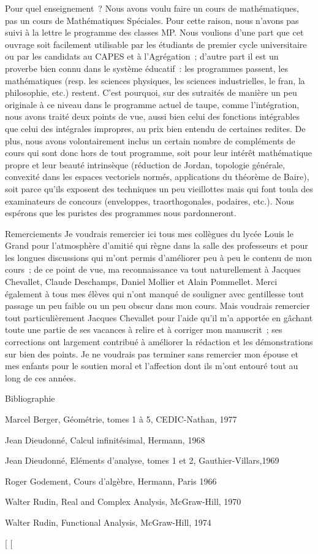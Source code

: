 \documentclass[]{article}
\begin{document}
Pour quel enseignement~? Nous avons voulu faire un cours de
mathématiques, pas un cours de Mathématiques Spéciales. Pour cette
raison, nous n'avons pas suivi à la lettre le programme des classes MP.
Nous voulions d'une part que cet ouvrage soit facilement utilisable par
les étudiants de premier cycle universitaire ou par les candidats au
CAPES et à l'Agrégation~; d'autre part il est un proverbe bien connu
dans le système éducatif~: les programmes passent, les mathématiques
(resp. les sciences physiques, les sciences industrielles, le
fran\ccais, la philosophie, etc.) restent. C'est
pourquoi, sur des su\jmathets traités de manière un peu originale à ce niveau
dans le programme actuel de taupe, comme l'intégration, nous avons
traité deux points de vue, aussi bien celui des fonctions intégrables
que celui des intégrales impropres, au prix bien entendu de certaines
redites. De plus, nous avons volontairement inclus un certain nombre de
compléments de cours qui sont donc hors de tout programme, soit pour
leur intérêt mathématique propre et leur beauté intrinsèque (réduction
de Jordan, topologie générale, convexité dans les espaces vectoriels
normés, applications du théorème de Baire), soit parce qu'ils exposent
des techniques un peu vieillottes mais qui font tou\jmathours la \jmathoie des
examinateurs de concours (enveloppes, tra\jmathectoires orthogonales,
podaires, etc.). Nous espérons que les puristes des programmes nous
pardonneront.

Remerciements Je voudrais remercier ici tous mes collègues du lycée
Louis le Grand pour l'atmosphère d'amitié qui règne dans la salle des
professeurs et pour les longues discussions qui m'ont permis d'améliorer
peu à peu le contenu de mon cours~; de ce point de vue, ma
reconnaissance va tout naturellement à Jacques Chevallet, Claude
Deschamps, Daniel Mollier et Alain Pommellet. Merci également à tous mes
élèves qui n'ont \jmathamais manqué de souligner avec gentillesse tout
passage un peu faible ou un peu obscur dans mon cours. Mais \jmathe voudrais
remercier tout particulièrement Jacques Chevallet pour l'aide qu'il m'a
apportée en gâchant toute une partie de ses vacances à relire et à
corriger mon manuscrit~; ses corrections \jmathudicieuses ont largement
contribué à améliorer la rédaction et les démonstrations sur bien des
points. Je ne voudrais pas terminer sans remercier mon épouse et mes
enfants pour le soutien moral et l'affection dont ils m'ont entouré tout
au long de ces années.

Bibliographie

Marcel Berger, Géométrie, tomes 1 à 5, CEDIC-Nathan, 1977

Jean Dieudonné, Calcul infinitésimal, Hermann, 1968

Jean Dieudonné, Eléments d'analyse, tomes 1 et 2, Gauthier-Villars,1969

Roger Godement, Cours d'algèbre, Hermann, Paris 1966

Walter Rudin, Real and Complex Analysis, McGraw-Hill, 1970

Walter Rudin, Functional Analysis, McGraw-Hill, 1974

{[}
{[}
\end{document}
